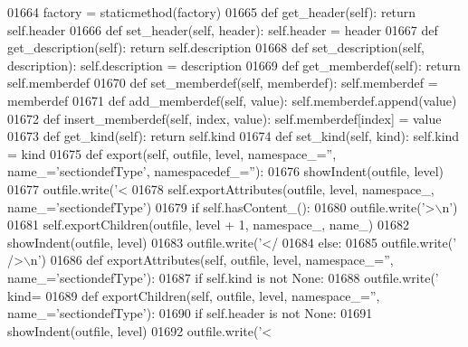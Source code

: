 \begin{DoxyCode}
{{{{{{{{{{{{{{{{{{{{{{{{{{{{{{{{{{{{{{{{{{{{{{{{{{{{{{{{{{{{{{{{{{{{{{{{{{{{{{{{{{{{{{{{{{{{{{{{{{{{{{{{{{{{01664     factory = staticmethod(factory)
01665     \textcolor{keyword}{def }get_header(self): \textcolor{keywordflow}{return} self.header
01666     \textcolor{keyword}{def }set_header(self, header): self.header = header
01667     \textcolor{keyword}{def }get_description(self): \textcolor{keywordflow}{return} self.description
01668     \textcolor{keyword}{def }set_description(self, description): self.description = description
01669     \textcolor{keyword}{def }get_memberdef(self): \textcolor{keywordflow}{return} self.memberdef
01670     \textcolor{keyword}{def }set_memberdef(self, memberdef): self.memberdef = memberdef
01671     \textcolor{keyword}{def }add_memberdef(self, value): self.memberdef.append(value)
01672     \textcolor{keyword}{def }insert_memberdef(self, index, value): self.memberdef[index] = value
01673     \textcolor{keyword}{def }get_kind(self): \textcolor{keywordflow}{return} self.kind
01674     \textcolor{keyword}{def }set_kind(self, kind): self.kind = kind
01675     \textcolor{keyword}{def }export(self, outfile, level, namespace\_='', name\_='sectiondefType', namespacedef\_=''):
01676         showIndent(outfile, level)
01677         outfile.write(\textcolor{stringliteral}{'<%
01678         self.exportAttributes(outfile, level, namespace\_, name\_=\textcolor{stringliteral}{'sectiondefType'})
01679         \textcolor{keywordflow}{if} self.hasContent_():
01680             outfile.write(\textcolor{stringliteral}{'>\(\backslash\)n'})
01681             self.exportChildren(outfile, level + 1, namespace\_, name\_)
01682             showIndent(outfile, level)
01683             outfile.write(\textcolor{stringliteral}{'</%
01684         \textcolor{keywordflow}{else}:
01685             outfile.write(\textcolor{stringliteral}{' />\(\backslash\)n'})
01686     \textcolor{keyword}{def }exportAttributes(self, outfile, level, namespace\_='', name\_='sectiondefType'):
01687         \textcolor{keywordflow}{if} self.kind \textcolor{keywordflow}{is} \textcolor{keywordflow}{not} \textcolor{keywordtype}{None}:
01688             outfile.write(\textcolor{stringliteral}{' kind=%
01689     \textcolor{keyword}{def }exportChildren(self, outfile, level, namespace\_='', name\_='sectiondefType'):
01690         \textcolor{keywordflow}{if} self.header \textcolor{keywordflow}{is} \textcolor{keywordflow}{not} \textcolor{keywordtype}{None}:
01691             showIndent(outfile, level)
01692             outfile.write(\textcolor{stringliteral}{'<%
}}}}}}}}}}}}}}}}}}}}}}}}}}}}}}}}}}}}}}}}}}}}}}}}}}}}}}}}}}}}}}}}}}}}}}}}}}}}}}}}}}}}}}}}}}}}}}}}}}}}}}}}}}}}}}}}
\end{DoxyCode}
